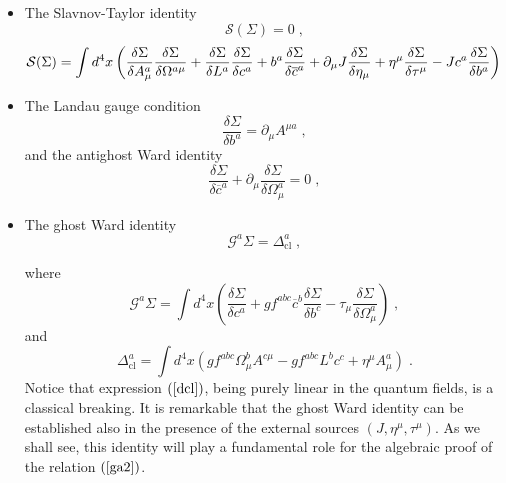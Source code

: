 \documentclass[a4paper,12pt]{article}
\begin{document}
\begin{itemize}
\item  The Slavnov-Taylor identity 
\begin{equation}
\mathcal{S}(\Sigma )=0\;,  \label{st}
\end{equation}
\begin{equation}
\mathcal{S}(\Sigma )=\int d^{4}x\left( \frac{\delta \Sigma }{\delta A_{\mu
}^{a}}\frac{\delta \Sigma }{\delta \Omega ^{a\mu }}+\frac{\delta \Sigma }{%
\delta L^{a}}\frac{\delta \Sigma }{\delta c^{a}}+b^{a}\frac{\delta \Sigma }{%
\delta \overline{c}^{a}}+\partial _{\mu }J\frac{\delta \Sigma }{\delta \eta
_{\mu }}+\eta ^{\mu }\frac{\delta \Sigma }{\delta \tau ^{\mu }}-Jc^{a}\frac{%
\delta \Sigma }{\delta b^{a}}\right) \;  \label{sto}
\end{equation}

\item  The Landau gauge condition 
\begin{equation}
\frac{\delta \Sigma }{\delta b^{a}}=\partial _{\mu }A^{\mu a}\;,
\label{gcond}
\end{equation}
and the antighost Ward identity 
\begin{equation}
\frac{\delta \Sigma }{\delta \overline{c}^{a}}+\partial _{\mu }\frac{\delta
\Sigma }{\delta \Omega _{\mu }^{a}}=0\;,  \label{agh}
\end{equation}

\item  The ghost Ward identity \cite{bps,book} 
\begin{equation}
\mathcal{G}^{a}\Sigma =\Delta _{\mathrm{cl}}^{a}\;,  \label{lghi}
\end{equation}

where 
\begin{equation}
\mathcal{G}^{a}\Sigma =\int d^{4}x\left( \frac{\delta \Sigma }{\delta c^{a}}%
+gf^{abc}\overline{c}^{b}\frac{\delta \Sigma }{\delta b^{c}}-\tau _{\mu }%
\frac{\delta \Sigma }{\delta \Omega _{\mu }^{a}}\right) \;,  \label{gop}
\end{equation}
and 
\begin{equation}
\Delta _{\mathrm{cl}}^{a}=\int d^{4}x\left( gf^{abc}\Omega _{\mu
}^{b}A^{c\mu }-gf^{abc}L^{b}c^{c}+\eta ^{\mu }A_{\mu }^{a}\right) \;.
\label{dcl}
\end{equation}
Notice that expression $\left( \ref{dcl}\right) $, being purely linear in
the quantum fields, is a classical breaking. It is remarkable that the ghost
Ward identity can be established also in the presence of the external
sources $\left( J,\eta ^{\mu },\tau ^{\mu }\right) $. As we shall see, this
identity will play a fundamental role for the algebraic proof of the
relation $\left( \ref{ga2}\right) $.
\end{itemize}
\end{document}

